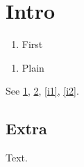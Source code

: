\documentclass{article}
\begin{document}
\section{Intro}\label{s1}
\begin{enumerate}
\item First\label{i1}
\end{enumerate}
\begin{enumerate}
\item Plain\label{i2}
\end{enumerate}
See \cref{s1}, \cref{s2}, \cref{i1}, \cref{i2}.
\begin{appendices}
\section{Extra}\label{s2}
Text.
\end{appendices}
\end{document}
